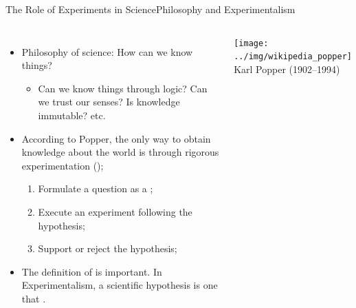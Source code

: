 \begin{frame}{The Role of Experiments in Science}{Philosophy and Experimentalism}
  \begin{columns}
    \begin{itemize}
      \item Philosophy of science: How can we know things?
      \begin{itemize}
        \item Can we know things through logic? Can we trust our senses? Is knowledge immutable? etc.
      \end{itemize}\bigskip

      \item According to Popper, the only way to obtain knowledge about the world is through rigorous experimentation ();
      \begin{enumerate}
        \item Formulate a question as a ;
        \item Execute an experiment following the hypothesis;
        \item Support or reject the hypothesis;
      \end{enumerate}\bigskip

      \item The definition of  is important. In Experimentalism, a scientific hypothesis is one that .
    \end{itemize}

    \texttt{[image: ../img/wikipedia\_popper]}\\
    Karl Popper (1902--1994)
  \end{columns}
\end{frame}


